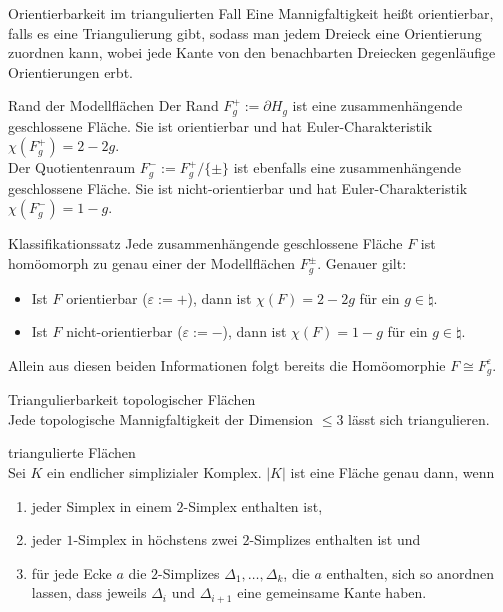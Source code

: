 \begin{Def}{Orientierbarkeit im triangulierten Fall}
    Eine Mannigfaltigkeit heißt orientierbar, falls es eine Triangulierung
    gibt, sodass man jedem Dreieck eine Orientierung zuordnen kann, wobei
    jede Kante von den benachbarten Dreiecken gegenläufige Orientierungen erbt.
\end{Def}

\begin{Satz}{Rand der Modellflächen}
    Der Rand $F_g^+ := \partial H_g$ ist eine zusammenhängende
    geschlossene Fläche.
    Sie ist orientierbar und hat Euler-Charakteristik
    $\chi(F_g^+) = 2 - 2g$. \\
    Der Quotientenraum $F_g^- := F_g^+ / \{\pm\}$ ist ebenfalls eine
    zusammenhängende geschlossene Fläche.
    Sie ist nicht-orientierbar und hat Euler-Charakteristik
    $\chi(F_g^-) = 1 - g$.
\end{Satz}

\linie

\begin{Satz}{Klassifikationssatz}
    Jede zusammenhängende geschlossene Fläche $F$ ist homöomorph zu genau einer
    der Modellflächen $F_g^\pm$.
    Genauer gilt:
    \begin{itemize}
        \item
        Ist $F$ orientierbar ($\varepsilon := +$),
        dann ist $\chi(F) = 2 - 2g$ für ein $g \in \natural$.

        \item
        Ist $F$ nicht-orientierbar ($\varepsilon := -$),
        dann ist $\chi(F) = 1 - g$ für ein $g \in \natural$.
    \end{itemize}
    Allein aus diesen beiden Informationen folgt bereits die Homöomorphie
    $F \cong F_g^\varepsilon$.
\end{Satz}

\linie

\begin{Satz}{Triangulierbarkeit topologischer Flächen}\\
    Jede topologische Mannigfaltigkeit der Dimension $\le 3$ lässt sich
    triangulieren.
\end{Satz}

\begin{Satz}{triangulierte Flächen}\\
    Sei $K$ ein endlicher simplizialer Komplex.
    $|K|$ ist eine Fläche genau dann, wenn
    \begin{enumerate}
        \item
        jeder Simplex in einem $2$-Simplex enthalten ist,

        \item
        jeder $1$-Simplex in höchstens zwei $2$-Simplizes enthalten ist und

        \item
        für jede Ecke $a$ die $2$-Simplizes $\Delta_1, \dotsc, \Delta_k$,
        die $a$ enthalten, sich so anordnen lassen, dass jeweils
        $\Delta_i$ und $\Delta_{i+1}$ eine gemeinsame Kante haben.
    \end{enumerate}
\end{Satz}

